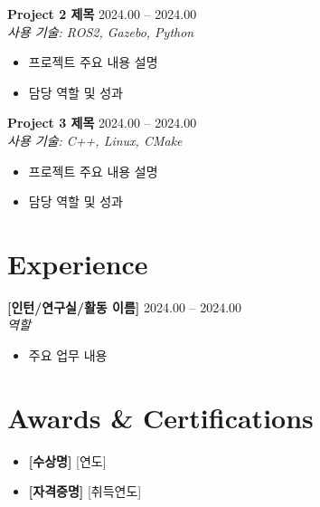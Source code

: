 \documentclass[11pt, a4paper]{article}
\begin{document}
\textbf{Project 2 제목} \hfill 2024.00 -- 2024.00 \\
\textit{사용 기술: ROS2, Gazebo, Python}
\begin{itemize}
  \item 프로젝트 주요 내용 설명
  \item 담당 역할 및 성과
\end{itemize}

\vspace{4pt}

\textbf{Project 3 제목} \hfill 2024.00 -- 2024.00 \\
\textit{사용 기술: C++, Linux, CMake}
\begin{itemize}
  \item 프로젝트 주요 내용 설명
  \item 담당 역할 및 성과
\end{itemize}

\section{Experience}

\textbf{[인턴/연구실/활동 이름]} \hfill 2024.00 -- 2024.00 \\
\textit{역할}
\begin{itemize}
  \item 주요 업무 내용
\end{itemize}

\section{Awards \& Certifications}

\begin{itemize}
  \item \textbf{[수상명]} \hfill [연도]
  \item \textbf{[자격증명]} \hfill [취득연도]
\end{itemize}
\end{document}
